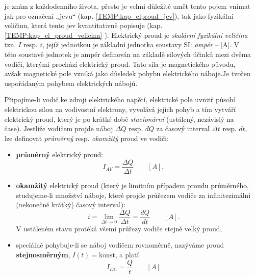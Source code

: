       \vspace{1em}
      \label{TEMP:kap_el_proud_velicina} je znám z každodenního života,
        přesto je velmi důležité umět tento pojem vnímat jak pro označení „jevu“ (kap.
        \ref{TEMP:kap_elproud_jev}), tak jako fyzikální veličinu, která tento jev kvantitativně
        popisuje (kap. \ref{TEMP:kap_el_proud_velicina} ). Elektrický proud je \emph{skalární
        fyzikální veličina} tzn. $I$ resp. $i$, jejíž jednotkou je základní jednotka soustavy SI:
        \emph{ampér} – [A]. V této soustavě jednotek je ampér definován na základě silových
        účinků mezi dvěma vodiči, kterými prochází elektrický proud. Tato síla je magnetického
        původu, avšak magnetické pole vzniká jako důsledek pohybu elektrického náboje.Je tvořen
        uspořádaným pohybem elektrických nábojů.
        
        Připojíme-li vodič ke zdroji elektrického napětí, elektrické pole uvnitř působí elektrickou
        silou na vodivostní elektrony, vyvolává jejich pohyb a tím vytváří elektrický proud, který
        je po krátké době \emph{stacionární} (ustálený, nezávislý na čase). Jestliže vodičem projde
        náboj $\Delta Q$ resp. $dQ$ za časový interval $\Delta t$ resp. $dt$, lze definovat
        \emph{průměrný} resp. \emph{okamžitý} proud ve vodiči:
        \begin{itemize}\addtolength{\itemsep}{-0.5\baselineskip}
          \item \textbf{průměrný} elektrický proud: $$I_{AV} = \frac{\Delta Q}{\Delta t}
                \qquad[A],$$
          \item \textbf{okamžitý} elektrický proud (který je limitním případem proudu průměrného,
                studujeme-li množství náboje, které projde průřezem vodiče za infinitezimální
                (nekonečně krátký) časový interval): $$i = \lim_{\Delta t \rightarrow 0}\frac{\Delta
                Q}{\Delta t} = \frac{dQ}{dt} \qquad[A].$$ V ustáleném stavu protéká všemi průřezy
                vodiče stejně velký proud,
          \item speciálně pohybuje-li se náboj vodičem rovnoměrně, nazýváme proud
                \textbf{stejno\-směr\-ným}, $I(t) = \text{konst}$, a platí $$ I_{DC} =
                \frac{Q}{t}\qquad[A] $$
        \end{itemize}        

